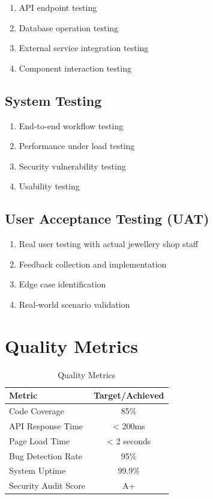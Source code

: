 \documentclass[12pt,a4paper]{report}
\begin{document}
\begin{enumerate}[label=\roman*)]
    \item API endpoint testing
    \item Database operation testing
    \item External service integration testing
    \item Component interaction testing
\end{enumerate}

\subsection{System Testing}

\begin{enumerate}[label=\roman*)]
    \item End-to-end workflow testing
    \item Performance under load testing
    \item Security vulnerability testing
    \item Usability testing
\end{enumerate}

\subsection{User Acceptance Testing (UAT)}

\begin{enumerate}[label=\roman*)]
    \item Real user testing with actual jewellery shop staff
    \item Feedback collection and implementation
    \item Edge case identification
    \item Real-world scenario validation
\end{enumerate}

\section{Quality Metrics}

\begin{table}[H]
    \centering
    \begin{tabular}{|l|c|}
        \hline
        \textbf{Metric} & \textbf{Target/Achieved} \\
        \hline
        Code Coverage & 85\% \\
        \hline
        API Response Time & < 200ms \\
        \hline
        Page Load Time & < 2 seconds \\
        \hline
        Bug Detection Rate & 95\% \\
        \hline
        System Uptime & 99.9\% \\
        \hline
        Security Audit Score & A+ \\
        \hline
    \end{tabular}
    \caption{Quality Metrics}
\end{table}
\end{document}
